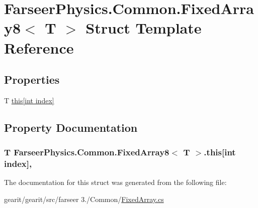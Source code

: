 \hypertarget{struct_farseer_physics_1_1_common_1_1_fixed_array8_3_01_t_01_4}{\section{Farseer\+Physics.\+Common.\+Fixed\+Array8$<$ T $>$ Struct Template Reference}
\label{struct_farseer_physics_1_1_common_1_1_fixed_array8_3_01_t_01_4}
}
\subsection*{Properties}
\begin{DoxyCompactItemize}
\item 
T \hyperlink{struct_farseer_physics_1_1_common_1_1_fixed_array8_3_01_t_01_4_af7743bc99f6d1240739cf8e99e99736c}{this\mbox{[}int index\mbox{]}}
\end{DoxyCompactItemize}


\subsection{Property Documentation}
\hypertarget{struct_farseer_physics_1_1_common_1_1_fixed_array8_3_01_t_01_4_af7743bc99f6d1240739cf8e99e99736c}{
\subsubsection[{this[int index]}]{\setlength{\rightskip}{0pt plus 5cm}T Farseer\+Physics.\+Common.\+Fixed\+Array8$<$ T $>$.this\mbox{[}int index\mbox{]}\hspace{0.3cm}{\ttfamily [get]}, {\ttfamily [set]}}}\label{struct_farseer_physics_1_1_common_1_1_fixed_array8_3_01_t_01_4_af7743bc99f6d1240739cf8e99e99736c}


The documentation for this struct was generated from the following file\+:\begin{DoxyCompactItemize}
\item 
gearit/gearit/src/farseer 3./\+Common/\hyperlink{_fixed_array_8cs}{Fixed\+Array.\+cs}\end{DoxyCompactItemize}
